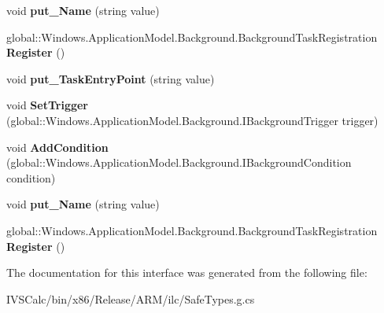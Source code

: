 \begin{DoxyCompactItemize}
\mbox{\label{interface_windows_1_1_application_model_1_1_background_1_1_i_background_task_builder_a6afa1eee875932d0aededbdee329d0c9}} 
void {\bfseries put\+\_\+\+Name} (string value)
\item 
\mbox{\label{interface_windows_1_1_application_model_1_1_background_1_1_i_background_task_builder_a3ba4e67514edc80bd1d8315fdbef330f}} 
global\+::\+Windows.\+Application\+Model.\+Background.\+Background\+Task\+Registration {\bfseries Register} ()
\item 
\mbox{\label{interface_windows_1_1_application_model_1_1_background_1_1_i_background_task_builder_a1d8e55116fd36c44eafe3e116a59e6d5}} 
void {\bfseries put\+\_\+\+Task\+Entry\+Point} (string value)
\item 
\mbox{\label{interface_windows_1_1_application_model_1_1_background_1_1_i_background_task_builder_a6389795cf781758bafc44a855ab10489}} 
void {\bfseries Set\+Trigger} (global\+::\+Windows.\+Application\+Model.\+Background.\+I\+Background\+Trigger trigger)
\item 
\mbox{\label{interface_windows_1_1_application_model_1_1_background_1_1_i_background_task_builder_aec7ccba5da7c8fc1b163a9871f3aba7c}} 
void {\bfseries Add\+Condition} (global\+::\+Windows.\+Application\+Model.\+Background.\+I\+Background\+Condition condition)
\item 
\mbox{\label{interface_windows_1_1_application_model_1_1_background_1_1_i_background_task_builder_a6afa1eee875932d0aededbdee329d0c9}} 
void {\bfseries put\+\_\+\+Name} (string value)
\item 
\mbox{\label{interface_windows_1_1_application_model_1_1_background_1_1_i_background_task_builder_a3ba4e67514edc80bd1d8315fdbef330f}} 
global\+::\+Windows.\+Application\+Model.\+Background.\+Background\+Task\+Registration {\bfseries Register} ()
\end{DoxyCompactItemize}


The documentation for this interface was generated from the following file\+:\begin{DoxyCompactItemize}
\item 
I\+V\+S\+Calc/bin/x86/\+Release/\+A\+R\+M/ilc/Safe\+Types.\+g.\+cs\end{DoxyCompactItemize}
